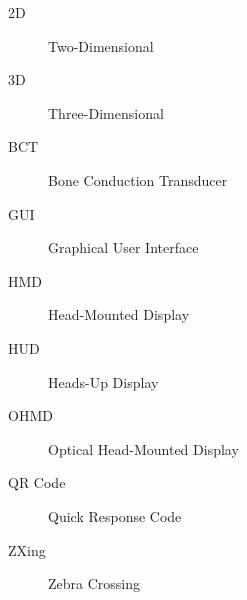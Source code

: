 \begin{description}
	\item [2D] Two-Dimensional
	\item [3D] Three-Dimensional
	\item [BCT] Bone Conduction Transducer
	\item [GUI] Graphical User Interface
	\item [HMD] Head-Mounted Display
	\item [HUD] Heads-Up Display
	\item [OHMD] Optical Head-Mounted Display
	\item [QR Code] Quick Response Code
	\item [ZXing] Zebra Crossing
\end{description}